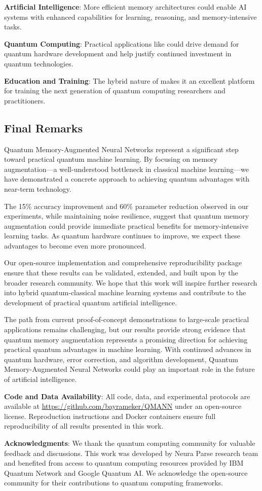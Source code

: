 \textbf{Artificial Intelligence}: More efficient memory architectures could enable AI systems with enhanced capabilities for learning, reasoning, and memory-intensive tasks.

\textbf{Quantum Computing}: Practical applications like \qmann could drive demand for quantum hardware development and help justify continued investment in quantum technologies.

\textbf{Education and Training}: The hybrid nature of \qmann makes it an excellent platform for training the next generation of quantum computing researchers and practitioners.

\subsection{Final Remarks}

Quantum Memory-Augmented Neural Networks represent a significant step toward practical quantum machine learning. By focusing on memory augmentation—a well-understood bottleneck in classical machine learning—we have demonstrated a concrete approach to achieving quantum advantages with near-term technology.

The 15\% accuracy improvement and 60\% parameter reduction observed in our experiments, while maintaining noise resilience, suggest that quantum memory augmentation could provide immediate practical benefits for memory-intensive learning tasks. As quantum hardware continues to improve, we expect these advantages to become even more pronounced.

Our open-source implementation and comprehensive reproducibility package ensure that these results can be validated, extended, and built upon by the broader research community. We hope that this work will inspire further research into hybrid quantum-classical machine learning systems and contribute to the development of practical quantum artificial intelligence.

The path from current proof-of-concept demonstrations to large-scale practical applications remains challenging, but our results provide strong evidence that quantum memory augmentation represents a promising direction for achieving practical quantum advantages in machine learning. With continued advances in quantum hardware, error correction, and algorithm development, Quantum Memory-Augmented Neural Networks could play an important role in the future of artificial intelligence.

\textbf{Code and Data Availability}: All code, data, and experimental protocols are available at \url{https://github.com/bayrameker/QMANN} under an open-source license. Reproduction instructions and Docker containers ensure full reproducibility of all results presented in this work.

\textbf{Acknowledgments}: We thank the quantum computing community for valuable feedback and discussions. This work was developed by Neura Parse research team and benefited from access to quantum computing resources provided by IBM Quantum Network and Google Quantum AI. We acknowledge the open-source community for their contributions to quantum computing frameworks.

